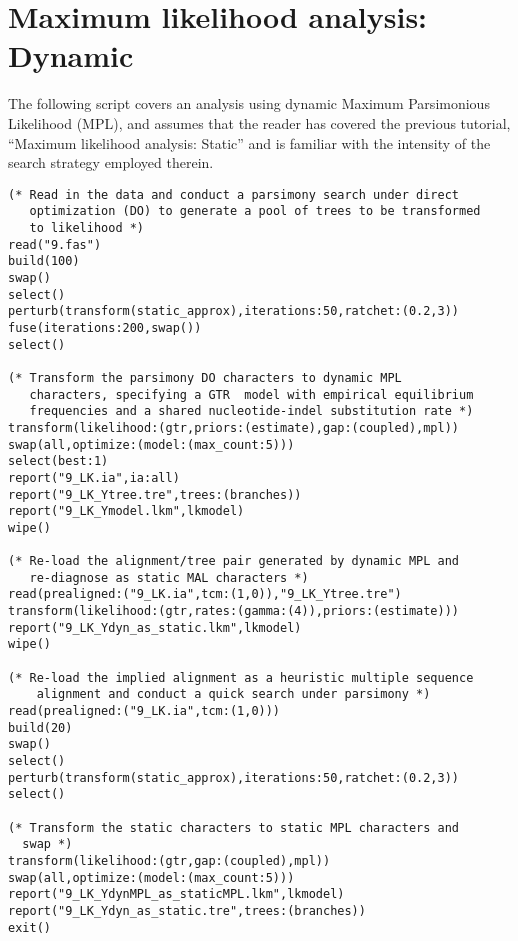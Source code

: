 \section{Maximum likelihood analysis: Dynamic}{\label{tutorial12}}
The following script covers an analysis using dynamic Maximum Parsimonious Likelihood (MPL), and assumes 
that the reader has covered the previous tutorial, ``Maximum likelihood analysis: Static'' and is 
familiar with the intensity of the search strategy employed therein. 
\begin{verbatim}
(* Read in the data and conduct a parsimony search under direct 
   optimization (DO) to generate a pool of trees to be transformed 
   to likelihood *)
read("9.fas")
build(100)
swap()
select()
perturb(transform(static_approx),iterations:50,ratchet:(0.2,3))
fuse(iterations:200,swap())
select()

(* Transform the parsimony DO characters to dynamic MPL
   characters, specifying a GTR  model with empirical equilibrium
   frequencies and a shared nucleotide-indel substitution rate *)
transform(likelihood:(gtr,priors:(estimate),gap:(coupled),mpl))
swap(all,optimize:(model:(max_count:5)))
select(best:1)
report("9_LK.ia",ia:all)
report("9_LK_Ytree.tre",trees:(branches))
report("9_LK_Ymodel.lkm",lkmodel)
wipe()

(* Re-load the alignment/tree pair generated by dynamic MPL and
   re-diagnose as static MAL characters *)
read(prealigned:("9_LK.ia",tcm:(1,0)),"9_LK_Ytree.tre")
transform(likelihood:(gtr,rates:(gamma:(4)),priors:(estimate)))
report("9_LK_Ydyn_as_static.lkm",lkmodel)
wipe()

(* Re-load the implied alignment as a heuristic multiple sequence
    alignment and conduct a quick search under parsimony *)
read(prealigned:("9_LK.ia",tcm:(1,0)))
build(20)
swap()
select()
perturb(transform(static_approx),iterations:50,ratchet:(0.2,3))
select()

(* Transform the static characters to static MPL characters and 
  swap *)
transform(likelihood:(gtr,gap:(coupled),mpl))
swap(all,optimize:(model:(max_count:5)))
report("9_LK_YdynMPL_as_staticMPL.lkm",lkmodel)
report("9_LK_Ydyn_as_static.tre",trees:(branches))
exit()
\end{verbatim}

